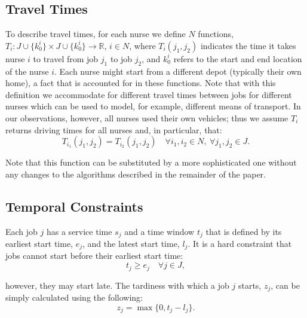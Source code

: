 \documentclass[a4paper,11pt,authoryear]{elsarticle}
\begin{document}
\subsection{Travel Times}
\label{sub:traveltimes}
\noindent To describe travel times, for each nurse we define $N$ functions, $T_i: J\cup\{k^i_0\} \times J\cup\{k^i_0\} \rightarrow \mathbb{R}$, $i \in N$, where $T_i(j_1, j_2)$ indicates the time it takes nurse $i$ to travel from job $j_1$ to job $j_2$, and $k^i_0$ refers to the start and end location of the nurse $i$. Each nurse might start from a different depot (typically their own home), a fact that is accounted for in these functions. Note that with this definition we accommodate for different travel times between jobs for different nurses which can be used to model, for example, different means of transport. In our observations, however, all nurses used their own vehicles; thus we assume $T_i$ returns driving times for all nurses and, in particular, that:
\begin{equation}
    T_{i_1}(j_1, j_2) = T_{i_2}(j_1, j_2)\quad  \forall i_1, i_2 \in N,\ \forall j_1, j_2 \in J. \label{eq:traveltimeequality}
\end{equation} 

\noindent Note that this function can be substituted by a more sophisticated one without any changes to the algorithms described in the remainder of the paper.


\subsection{Temporal Constraints}
\label{sub:temporalconstraints}
\noindent Each job $j$ has a service time $s_j$ and a time window $t_j$ that is defined by its earliest start time, $e_j$, and the latest start time, $l_j$. It is a hard constraint that jobs cannot start before their earliest start time:
\begin{equation}
    t_j \geq e_j \quad \forall j \in J, \label{eq:jobstart}
\end{equation}

\noindent however, they may start late. The tardiness with which a job $j$ starts, $z_j$, can be simply calculated using the following:
\begin{equation}
    z_j = \max\{0, t_j - l_j\}. \label{eq:tardiness}
\end{equation}
\end{document}
